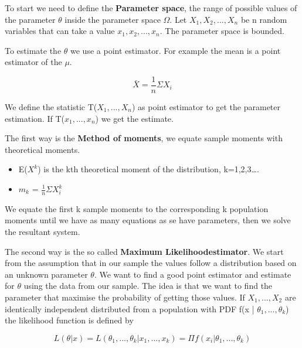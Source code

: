 \vspace{10pt}

To start we need to define the \textbf{Parameter space}, the range of possible values of the parameter $\theta$ inside the parameter space $\Omega$.
Let $X_1, X_2, ..., X_n$ be n random variables that can take a value $x_1, x_2, ..., x_n$.
The parameter space is bounded.

\vspace{10pt}

To estimate the $\theta$ we use a point estimator. For example the mean is a point estimator of the $\mu$.

\begin{equation}
    \bar{X} = \frac{1}{n} \Sigma X_i
\end{equation}

We define the statistic T($X_1, ..., X_n$) as point estimator to get the parameter estimation.
If T($x_1, ..., x_n$) we get the estimate.


\vspace{10pt}

The first way is the \textbf{Method of moments}, we equate sample moments with theoretical moments.

\begin{itemize}
    \item E($X^k$) is the kth theoretical moment of the distribution, k=1,2,3\dots.
    \item $m_k$ = $ \frac{1}{n} \Sigma X_i^k$
\end{itemize}

We equate the first k sample moments to the corresponding k population moments until we have as many equations as se have
parameters, then we solve the resultant system.

\vspace{10pt}

The second way is the so called \textbf{Maximum Likelihoodestimator}. We start from the
assumption that in our sample the values follow a distribution based on an unknown 
parameter $\theta$. We want to find a good point estimator and estimate for $\theta$ using
the data from our sample. The idea is that we want to find the parameter that maximise
the probability of getting those values. If $X_1, ..., X_2$ are identically independent 
distributed  from a population with PDF f(x | $\theta_1, ..., \theta_k$) the likelihood 
function is defined by

\begin{equation}
    L(\theta|x) = L(\theta_1, ..., \theta_k | x_1, ..., x_k) = \Pi f(x_i|\theta_1, ..., \theta_k)
\end{equation}

